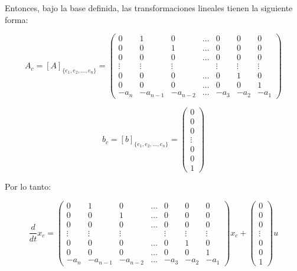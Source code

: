 \documentclass[12pt]{article}
\numberwithin{equation}{subsection}
\begin{document}
Entonces, bajo la base definida, las transformaciones lineales tienen la siguiente forma:

\begin{equation}
A_c = \left[ A \right]_{\{ e_1, e_2, \dots, e_n \}} =
\begin{pmatrix}
0 & 1 & 0 & \dots & 0 & 0 & 0 \\
0 & 0 & 1 & \dots & 0 & 0 & 0 \\
0 & 0 & 0 & \dots & 0 & 0 & 0 \\
\vdots & \vdots & \vdots & & \vdots & \vdots & \vdots \\
0 & 0 & 0 & \dots & 0 & 1 & 0 \\
0 & 0 & 0 & \dots & 0 & 0 & 1 \\
-a_{n} & -a_{n-1} & -a_{n-2} & \dots & -a_{3} & -a_{2} & -a_{1}
\end{pmatrix}
\end{equation}

\begin{equation}
b_c = \left[ b \right]_{\{ e_1, e_2, \dots, e_n \}} =
\begin{pmatrix}
0 \\
0 \\
0 \\
\vdots \\
0 \\
0 \\
1
\end{pmatrix}
\end{equation}

Por lo tanto:

\begin{equation}
\frac{d}{dt} x_c =
\begin{pmatrix}
0 & 1 & 0 & \dots & 0 & 0 & 0 \\
0 & 0 & 1 & \dots & 0 & 0 & 0 \\
0 & 0 & 0 & \dots & 0 & 0 & 0 \\
\vdots & \vdots & \vdots & & \vdots & \vdots & \vdots \\
0 & 0 & 0 & \dots & 0 & 1 & 0 \\
0 & 0 & 0 & \dots & 0 & 0 & 1 \\
-a_{n} & -a_{n-1} & -a_{n-2} & \dots & -a_{3} & -a_{2} & -a_{1}
\end{pmatrix} x_c +
\begin{pmatrix}
0 \\
0 \\
0 \\
\vdots \\
0 \\
0 \\
1
\end{pmatrix} u
\end{equation}
\end{document}
